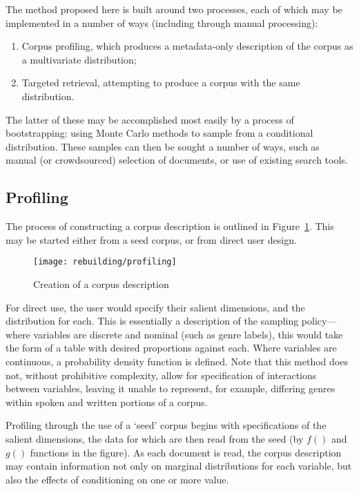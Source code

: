 
The method proposed here is built around two processes, each of which may be implemented in a number of ways (including through manual processing):

\begin{enumerate}
    \item Corpus profiling, which produces a metadata-only description of the corpus as a multivariate distribution;
    \item Targeted retrieval, attempting to produce a corpus with the same distribution.
\end{enumerate}

The latter of these may be accomplished most easily by a process of bootstrapping: using Monte Carlo methods to sample from a conditional distribution.  These samples can then be sought a number of ways, such as manual (or crowdsourced) selection of documents, or use of existing search tools.

\subsection{Profiling}
The process of constructing a corpus description is outlined in Figure~\ref{fig:rebuilding:profiling}.  This may be started either from a seed corpus, or from direct user design.

\begin{figure}[h]
    \centering
    \texttt{[image: rebuilding/profiling]}
    \caption{Creation of a corpus description}
    \label{fig:rebuilding:profiling}
\end{figure}


For direct use, the user would specify their salient dimensions, and the distribution for each.  This is essentially a description of the sampling policy---where variables are discrete and nominal (such as genre labels), this would take the form of a table with desired proportions against each.  Where variables are continuous, a probability density function is defined.  Note that this method does not, without prohibitive complexity, allow for specification of interactions between variables, leaving it unable to represent, for example, differing genres within spoken and written portions of a corpus.

Profiling through the use of a `seed' corpus begins with specifications of the salient dimensions, the data for which are then read from the seed (by $f()$ and $g()$ functions in the figure).  As each document is read, the corpus description may contain information not only on marginal distributions for each variable, but also the effects of conditioning on one or more value.

